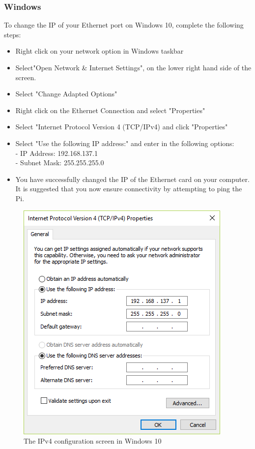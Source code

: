 \subsubsection{Windows}
To change the IP of your Ethernet port on Windows 10, complete the following steps:
\begin{itemize}
    \item Right click on your network option in Windows taskbar
    \item Select"Open Network \& Internet Settings", on the lower right hand side of the screen.
    \item Select "Change Adapted Options"
    \item Right click on the Ethernet Connection and select "Properties"
    \item Select "Internet Protocol Version 4 (TCP/IPv4) and click "Properties"
    \item Select "Use the following IP address:" and enter in the following options:\\
            - IP Address: 192.168.137.1\\
            - Subnet Mask: 255.255.255.0
    \item You have successfully changed the IP of the Ethernet card on your computer. It is suggested that you now ensure connectivity by attempting to ping the Pi.
\end{itemize}

\begin{figure}[H]
\centering
\includegraphics[width=0.6\columnwidth]{Figures/WindowsIPConfig}
\caption{The IPv4 configuration screen in Windows 10}
\label{fig:WindowsIPConfig}
\end{figure}


